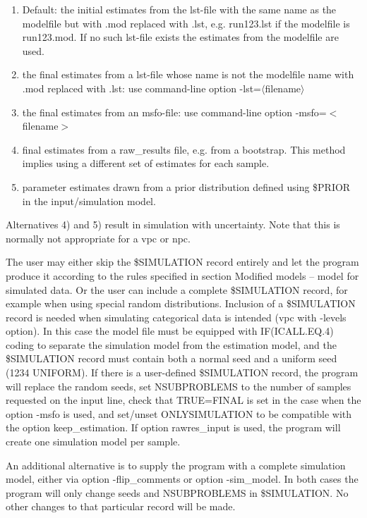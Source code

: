 \begin{enumerate}
	\item Default: the initial estimates from the lst-file with the same name as the modelfile but with .mod replaced with .lst, e.g. run123.lst if the modelfile is run123.mod. If no such lst-file exists the estimates from the modelfile are used.
	\item the final estimates from a lst-file whose name is not the modelfile name with .mod replaced with .lst: use command-line option -lst=$\langle$filename$\rangle$
	\item the final estimates from an msfo-file: use command-line option -msfo=$<$filename$>$
	\item final estimates from a raw\_results file, e.g. from a bootstrap. This method implies using a different set of estimates for each sample. 
	\item parameter estimates drawn from a prior distribution defined using \$PRIOR in the input/simulation model.
\end{enumerate}

Alternatives 4) and 5) result in simulation with uncertainty. Note that this is normally not appropriate for a vpc or npc. 

The user may either skip the \$SIMULATION record entirely and let the program produce it according to the rules specified in section Modified models – model for simulated data. Or the user can include a complete \$SIMULATION record, for example when using special random distributions. Inclusion of a \$SIMULATION record is needed when simulating categorical data is intended (vpc with -levels option). In this case the model file must be equipped with IF(ICALL.EQ.4) coding to separate the simulation model from the estimation model, and the \$SIMULATION record must contain both a normal seed and a uniform seed (1234 UNIFORM). If there is a user-defined \$SIMULATION record, the program will replace the random seeds, set NSUBPROBLEMS to the number of samples requested on the input line, check that TRUE=FINAL is set in the case when the option -msfo is used, and set/unset ONLYSIMULATION to be compatible with the option keep\_estimation. If option rawres\_input is used, the program will create one simulation model per sample.

An additional alternative is to supply the program with a complete simulation model, either via option -flip\_comments or option -sim\_model. In both cases the program will only change seeds and NSUBPROBLEMS in \$SIMULATION. No other changes to that particular record will be made.

